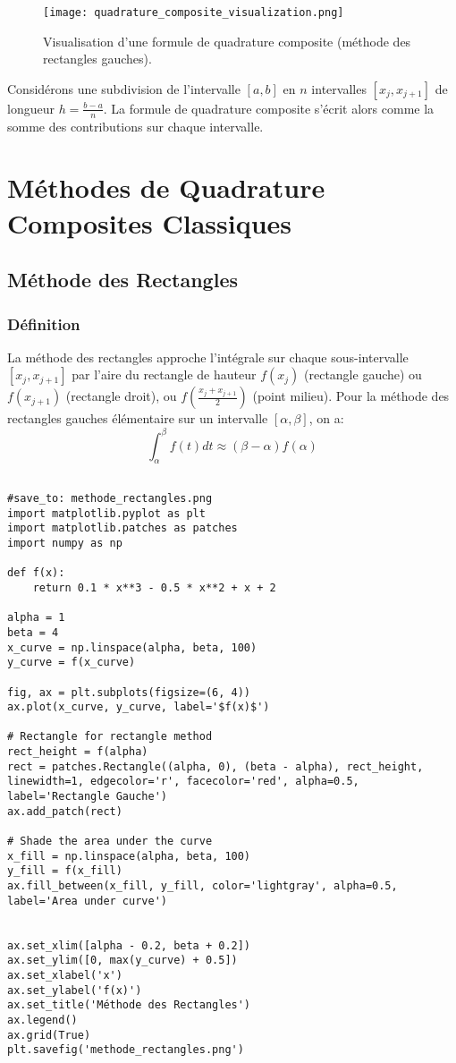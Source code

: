 \documentclass{article}
\begin{document}
\begin{figure}[h]
    \centering
    \texttt{[image: quadrature\_composite\_visualization.png]}
    \caption{Visualisation d'une formule de quadrature composite (méthode des rectangles gauches).}
    \label{fig:quadrature_composite_visualization}
\end{figure}


Considérons une subdivision de l'intervalle $[a, b]$ en $n$ intervalles $[x_j, x_{j+1}]$ de longueur $h = \frac{b-a}{n}$. La formule de quadrature composite s'écrit alors comme la somme des contributions sur chaque intervalle.

\section{Méthodes de Quadrature Composites Classiques}

\subsection{Méthode des Rectangles}

\subsubsection{Définition}

La méthode des rectangles approche l'intégrale sur chaque sous-intervalle $[x_j, x_{j+1}]$ par l'aire du rectangle de hauteur $f(x_j)$ (rectangle gauche) ou $f(x_{j+1})$ (rectangle droit), ou $f(\frac{x_j+x_{j+1}}{2})$ (point milieu). Pour la méthode des rectangles gauches élémentaire sur un intervalle $[\alpha, \beta]$, on a:
\[ \int_{\alpha}^{\beta} f(t) dt \approx (\beta - \alpha) f(\alpha) \]

\begin{verbatim}

#save_to: methode_rectangles.png
import matplotlib.pyplot as plt
import matplotlib.patches as patches
import numpy as np

def f(x):
    return 0.1 * x**3 - 0.5 * x**2 + x + 2

alpha = 1
beta = 4
x_curve = np.linspace(alpha, beta, 100)
y_curve = f(x_curve)

fig, ax = plt.subplots(figsize=(6, 4))
ax.plot(x_curve, y_curve, label='$f(x)$')

# Rectangle for rectangle method
rect_height = f(alpha)
rect = patches.Rectangle((alpha, 0), (beta - alpha), rect_height, linewidth=1, edgecolor='r', facecolor='red', alpha=0.5, label='Rectangle Gauche')
ax.add_patch(rect)

# Shade the area under the curve
x_fill = np.linspace(alpha, beta, 100)
y_fill = f(x_fill)
ax.fill_between(x_fill, y_fill, color='lightgray', alpha=0.5, label='Area under curve')


ax.set_xlim([alpha - 0.2, beta + 0.2])
ax.set_ylim([0, max(y_curve) + 0.5])
ax.set_xlabel('x')
ax.set_ylabel('f(x)')
ax.set_title('Méthode des Rectangles')
ax.legend()
ax.grid(True)
plt.savefig('methode_rectangles.png')

\end{verbatim}
\end{document}

